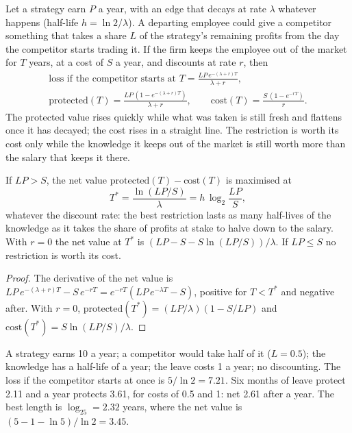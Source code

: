 Let a strategy earn $P$ a year, with an edge that decays at rate $\lambda$ whatever happens (half-life $h=\ln2/\lambda$). A departing employee
could give a competitor something that takes a share $L$ of the strategy's remaining profits from the day the competitor starts trading it. If the
firm keeps the employee out of the market for $T$ years, at a cost of $S$ a year, and discounts at rate $r$, then
\begin{gather*}
\text{loss if the competitor starts at } T = \frac{LP\,e^{-(\lambda+r)T}}{\lambda+r},\\
\text{protected}(T)=\frac{LP\,(1-e^{-(\lambda+r)T})}{\lambda+r},\qquad \text{cost}(T)=\frac{S\,(1-e^{-rT})}{r}.
\end{gather*}
The protected value rises quickly while what was taken is still fresh and flattens once it has decayed; the cost rises in a straight line. The
restriction is worth its cost only while the knowledge it keeps out of the market is still worth more than the salary that keeps it there.

\begin{proposition}\label{prop:fm:intellectual-property-and-non-competes:six}
If $LP>S$, the net value $\text{protected}(T)-\text{cost}(T)$ is maximised at
\[
T^*=\frac{\ln(LP/S)}{\lambda}=h\,\log_2\frac{LP}{S},
\]
whatever the discount rate: the best restriction lasts as many half-lives of the knowledge as it takes the share of profits at stake to halve down
to the salary. With $r=0$ the net value at $T^*$ is $(LP-S-S\ln(LP/S))/\lambda$. If $LP\le S$ no restriction is worth its cost.
\end{proposition}

\begin{proof}
The derivative of the net value is $LP\,e^{-(\lambda+r)T}-S\,e^{-rT}=e^{-rT}(LP\,e^{-\lambda T}-S)$, positive for $T<T^*$ and negative after. With
$r=0$, $\text{protected}(T^*)=(LP/\lambda)(1-S/LP)$ and $\text{cost}(T^*)=S\ln(LP/S)/\lambda$.
\end{proof}

\begin{example}\label{ex:fm:intellectual-property-and-non-competes:hand}
A strategy earns 10 a year; a competitor would take half of it ($L=0.5$); the knowledge has a half-life of a year; the leave costs 1 a year; no
discounting. The loss if the competitor starts at once is $5/\ln2=7.21$. Six months of leave protect 2.11 and a year protects 3.61, for costs of
0.5 and 1: net 2.61 after a year. The best length is $\log_25=2.32$ years, where the net value is $(5-1-\ln5)/\ln2=3.45$.
\end{example}

